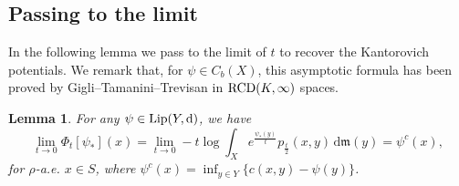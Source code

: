 \documentclass[a4paper,11pt]{article}
\numberwithin{equation}{section}
\theoremstyle{plain}
\newtheorem{lemma}[theorem]{Lemma}
\theoremstyle{definition}
\theoremstyle{remark}
\newcommand{\mm}{\mathfrak m}
\newcommand{\rcd}{{\rm RCD}(K, \infty)}
\newcommand{\Lip}{\mathop{\rm Lip}\nolimits}
\renewcommand{\d}{{\mathrm d}}
\begin{document}
	\subsection{Passing to the limit}
	In the following lemma we pass to the limit of $t$ to recover the  Kantorovich potentials.   We remark that,  for $\psi\in C_b(X)$,  this asymptotic formula has been proved by Gigli--Tamanini--Trevisan \cite[Proposition 5.2]{GTT25} in $\rcd$ spaces.
	\begin{lemma}\label{l0.20}
		For any $\psi\in \Lip(Y, \d)$,  we have 
		\begin{equation}\label{2.38}
			\lim_{t\rightarrow0}{\Phi}_t[\psi_{*}](x)=\lim_{t\rightarrow0}-t\log \int_X e^{\frac{\psi_*(y)}{t}} p_\frac{t}{2}(x,y)\,\d\mm(y)=\psi^c(x),
		\end{equation}
		for $\rho$-a.e. $x\in S$, where $\psi^c(x)=\inf_{y\in Y}\{c(x,y)-\psi(y)\}$.   
	\end{lemma}
\end{document}
